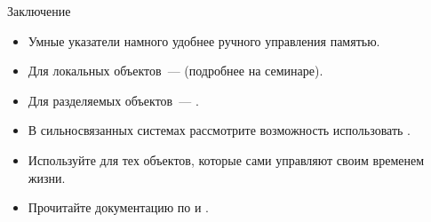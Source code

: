 \documentclass{beamer}
\begin{document}
\begin{frame}[fragile]{Заключение}
\small
\begin{itemize}
    \item Умные указатели намного удобнее ручного управления памятью.
    \item Для локальных объектов~---  (подробнее на семинаре).
    \item Для разделяемых объектов~--- .
    \item В сильносвязанных системах рассмотрите возможность использовать .    
    \item Используйте  для тех объектов, которые
        сами управляют своим временем жизни.
    \item Прочитайте документацию по  и .
\end{itemize}
\end{frame}
\end{document}
